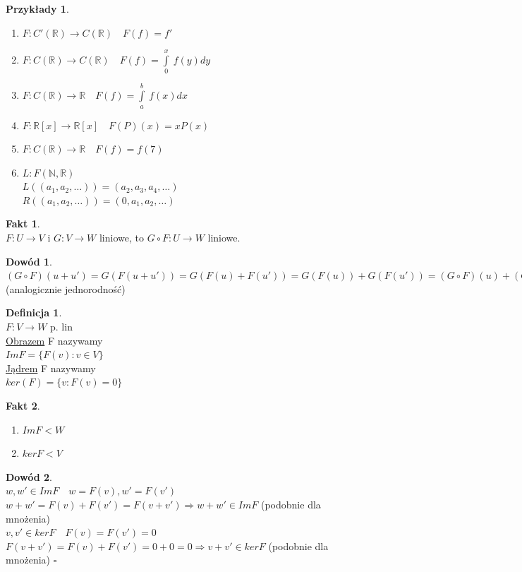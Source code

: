 \documentclass[12pt,a4paper]{article}
\newcommand{\RR}{\mathbb{R}}
\renewcommand{\qed}{$\square$}
\theoremstyle{plain}
\theoremstyle{definition}
\newtheorem{ft}{Fakt}[section]
\theoremstyle{definition}
\newtheorem{df}{Definicja}[section]
\theoremstyle{definition}
\theoremstyle{definition}
\newtheorem*{dd}{Dowód}
\theoremstyle{definition}
\theoremstyle{definition}
\theoremstyle{definition}
\newtheorem*{przy}{Przykłady}
\theoremstyle{definition}
\theoremstyle{definition}
\begin{document}
\begin{przy}
\begin{enumerate}[{(}1{)}]
        \item $F : C'(\RR) \rightarrow C(\RR) \quad F(f) = f'$ 
        \item $F: C(\RR) \rightarrow C(\RR) \quad F(f) = \int\limits_0^x \ f(y) dy$ 
        \item $F: C(\RR) \rightarrow \RR \quad F(f) = \int\limits_a^b \ f(x) dx$ 
        \item $F: \RR [x] \rightarrow \RR[x] \quad F(P)(x) = xP(x)$
        \item $F: C(\RR) \rightarrow \RR \quad F(f) =f(7)$
        \item $L: F(\mathbb{N},\RR)  $ \\ %
        $L((a_1,a_2,\dots)) = (a_2,a_3,a_4,\dots)$ \\
        $R((a_1,a_2,\dots)) = (0,a_1,a_2,\dots)$ 
    \end{enumerate}
\end{przy}
\begin{ft} \hfill 
    \\
    $F: U \rightarrow V $ i $G: V \rightarrow W$ liniowe, to $G \circ F: U \rightarrow W $ liniowe. 
\end{ft}

\begin{dd}
    $(G \circ F)(u+u') = G(F(u+u')) = G(F(u) + F(u')) = G(F(u)) + G(F(u')) = (G \circ F)(u) + (G \circ F)(u') $ (analogicznie jednorodność)
\end{dd}

\begin{df} \hfill \\
    $F: V \rightarrow W $ p. lin \\
    \underline{Obrazem} F nazywamy \\
    $Im F = \{ F(v): v \in V\}$ \\
    \underline{Jądrem} F nazywamy \\
    $ker(F) = \{v: F(v) = 0\}$ \\
\end{df} 
\begin{ft} \hfill 
    \begin{enumerate}[{(}1{)}]
        \item $Im F < W$
        \item $kerF < V$
    \end{enumerate}
\end{ft}

\begin{dd} 
    ~\\
    $w,w' \in Im F \quad w=F(v), w'=F(v')$ \\
    $w+w' = F(v) + F(v') = F(v+v') \Rightarrow w+w' \in ImF$ (podobnie dla mnożenia) \\
    $v,v' \in ker F \quad F(v) = F(v') = 0$ \\
    $F(v+v') = F(v) + F(v') = 0 + 0 = 0 \Rightarrow v+v' \in ker F$ (podobnie dla mnożenia)
    \qed
\end{dd}
\end{document}
